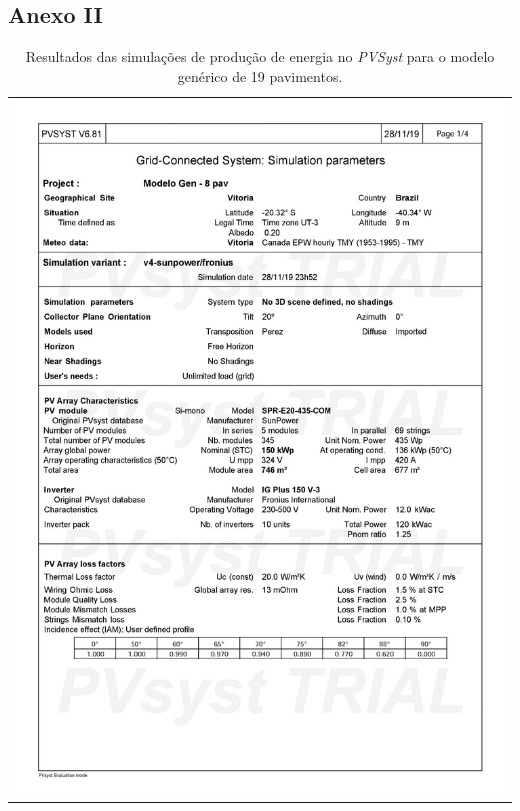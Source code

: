 \subsection{Anexo II}
\begin{table}[H]
    \centering
    \caption{Resultados das simulações de produção de energia no \textit{PVSyst} para o modelo genérico de 19 pavimentos.}
    \begin{tabular}{l}
        \includegraphics[width=\textwidth]{figures/attachments/resultpv21.jpg}
    \end{tabular}
    \label{tab:22}
\end{table}
\pagebreak
